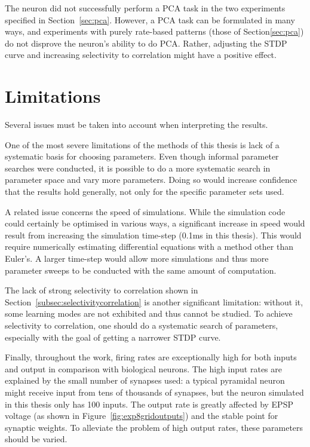 \documentclass[a4paper,12pt]{report}
\theoremstyle{definition}
\begin{document}
The neuron did not successfully perform a PCA task in the two experiments specified in Section~\ref{sec:pca}. However, a PCA task can be formulated in many ways, and experiments with purely rate-based patterns (those of Section\ref{sec:pca}) do not disprove the neuron's ability to do PCA. Rather, adjusting the STDP curve and increasing selectivity to correlation might have a positive effect.





\section{Limitations}

Several issues must be taken into account when interpreting the results.

One of the most severe limitations of the methods of this thesis is lack of a systematic basis for choosing parameters. Even though informal parameter searches were conducted, it is possible to do a more systematic search in parameter space and vary more parameters. Doing so would increase confidence that the results hold generally, not only for the specific parameter sets used.

A related issue concerns the speed of simulations. While the simulation code could certainly be optimised in various ways, a significant increase in speed would result from increasing the simulation time-step (0.1ms in this thesis). This would require numerically estimating differential equations with a method other than Euler's. A larger time-step would allow more simulations and thus more parameter sweeps to be conducted with the same amount of computation.

The lack of strong selectivity to correlation shown in Section~\ref{subsec:selectivitycorrelation} is another significant limitation: without it, some learning modes are not exhibited and thus cannot be studied. To achieve selectivity to correlation, one should do a systematic search of parameters, especially with the goal of getting a narrower STDP curve.

Finally, throughout the work, firing rates are exceptionally high for both inputs and output in comparison with biological neurons. The high input rates are explained by the small number of synapses used: a typical pyramidal neuron might receive input from tens of thousands of synapses, but the neuron simulated in this thesis only has 100 inputs. The output rate is greatly affected by EPSP voltage (as shown in Figure~\ref{fig:exp8gridoutputs}) and the stable point for synaptic weights. To alleviate the problem of high output rates, these parameters should be varied.
\end{document}
